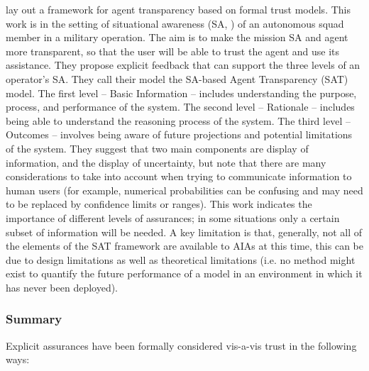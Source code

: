 \citet{Chen2014-dk} lay out a framework for agent transparency based on formal trust models. This work is in the setting of situational awareness (SA, \cite{Endsley1995-ie}) of an autonomous squad member in a military operation. The aim is to make the mission SA and agent more transparent, so that the user will be able to trust the agent and use its assistance. They propose explicit feedback that can support the three levels of an operator's SA. They call their model the SA-based Agent Transparency (SAT) model. The first level -- Basic Information -- includes understanding the purpose, process, and performance of the system. The second level -- Rationale -- includes being able to understand the reasoning process of the system. The third level -- Outcomes -- involves being aware of future projections and potential limitations of the system. They suggest that two main components are display of information, and the display of uncertainty, but note that there are many considerations to take into account when trying to communicate information to human users (for example, numerical probabilities can be confusing and may need to be replaced by confidence limits or ranges). This work indicates the importance of different levels of assurances; in some situations only a certain subset of information will be needed. A key limitation is that, generally, not all of the elements of the SAT framework are available to AIAs at this time, this can be due to design limitations as well as theoretical limitations (i.e. no method might exist to quantify the future performance of a model in an environment in which it has never been deployed).

\subsubsection{Summary}
Explicit assurances have been formally considered vis-a-vis trust in the following ways:

